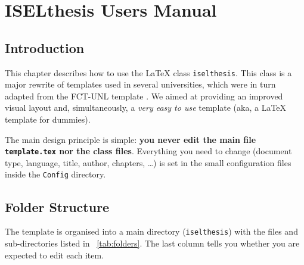 \chapter{ISELthesis Users Manual}
\label{cha:users_manual}

\newcommand{\edityes}{\textbf{\color{ForestGreen}yes}}
\newcommand{\editno}{\textbf{\color{red}no}}

\section{Introduction} %
\label{sec:introduction}

This chapter describes how to use the \LaTeX{} class \texttt{iselthesis}. This class is a major rewrite of templates used in several universities, which were in turn adapted from the FCT-UNL template \cite{novathesis-manual}. We aimed at providing an improved visual layout and, simultaneously, a \emph{very easy to use} template (aka, a \LaTeX{} template for dummies).

The main design principle is simple: \textbf{you never edit the main file \texttt{template.tex} nor the class files}. Everything you need to change (document type, language, title, author, chapters, \ldots) is set in the small configuration files inside the \texttt{Config} directory.

\noindent%

\section{Folder Structure} %
\label{sec:folder_structure}

The template is organised into a main directory (\texttt{iselthesis}) with the files and sub-directories listed in \tablename~\ref{tab:folders}. The last column tells you whether you are expected to edit each item.


